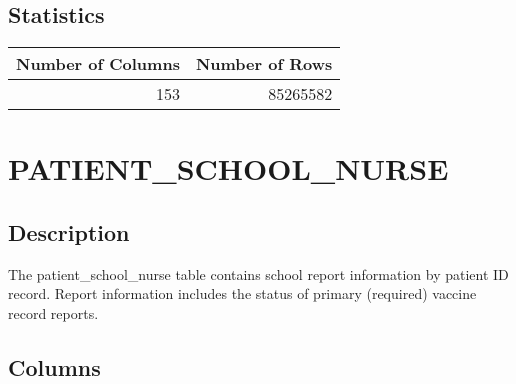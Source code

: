 \documentclass[
  letterpaper,
  DIV=11,
  numbers=noendperiod]{scrreprt}
\begin{document}
\hypertarget{statistics-29}{%
\section*{Statistics}\label{statistics-29}}

\begin{longtable}{rr}
\toprule
Number of Columns & Number of Rows \\ 
\midrule
153 & 85265582 \\ 
\bottomrule
\end{longtable}

\hypertarget{patient_school_nurse}{%
\chapter*{PATIENT\_SCHOOL\_NURSE}\label{patient_school_nurse}}

\hypertarget{description-30}{%
\section*{Description}\label{description-30}}

The patient\_school\_nurse table contains school report information by
patient ID record. Report information includes the status of primary
(required) vaccine record reports.

\hypertarget{columns-30}{%
\section*{Columns}\label{columns-30}}
\end{document}

